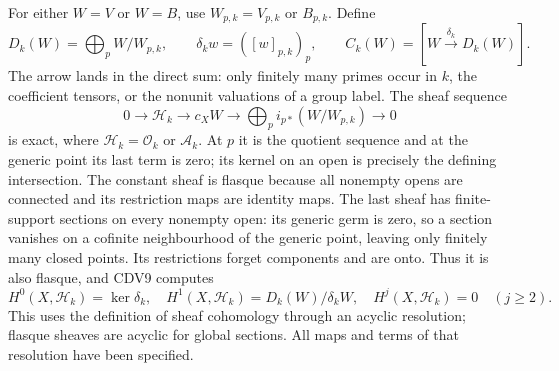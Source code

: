 \documentclass[11pt,a4paper]{article}
\theoremstyle{definition}\newtheorem{definition}[theorem]{Definition}
\begin{document}
For either $W=V$ or $W=B$, use $W_{p,k}=V_{p,k}$ or $B_{p,k}$.
Define
\begin{equation}\tag{CDV8}
 D_k(W)=\bigoplus_pW/W_{p,k},\qquad
 \delta_k w=([w]_{p,k})_p,\qquad
 C_k(W)=[W\xrightarrow{\delta_k}D_k(W)].
\end{equation}
The arrow lands in the direct sum: only finitely many primes occur
in $k$, the coefficient tensors, or the nonunit valuations of a group
label. The sheaf sequence
\begin{equation}\tag{CDV9}
 0\longrightarrow\mathcal H_k\longrightarrow c_XW
 \longrightarrow\bigoplus_p i_{p*}(W/W_{p,k})\longrightarrow0
\end{equation}
is exact, where $\mathcal H_k=\mathcal O_k$ or $\mathcal A_k$.
At $p$ it is the quotient sequence and at the generic point its last
term is zero; its kernel on an open is precisely the defining
intersection. The constant sheaf is flasque because all nonempty
opens are connected and its restriction maps are identity maps. The
last sheaf has finite-support sections on every nonempty open:
its generic germ is zero, so a section vanishes on a cofinite
neighbourhood of the generic point, leaving only finitely many closed
points. Its restrictions forget components and are onto. Thus it is
also flasque, and CDV9 computes
\begin{equation}\tag{CDV10}
 H^0(X,\mathcal H_k)=\ker\delta_k,\quad
 H^1(X,\mathcal H_k)=D_k(W)/\delta_kW,\quad
 H^j(X,\mathcal H_k)=0\quad(j\ge2).
\end{equation}
This uses the definition of sheaf cohomology through an acyclic
resolution; flasque sheaves are acyclic for global sections. All
maps and terms of that resolution have been specified.
\end{document}
